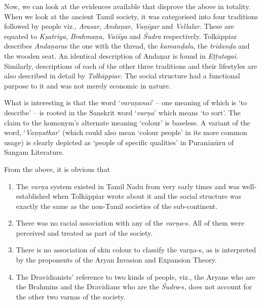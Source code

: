 Now, we can look at the evidences available that disprove the above in totality. When we look at the ancient Tamil society, it was categorised into four traditions followed by people viz., \textit{Arasar}, \textit{Andaṇar}, \textit{Vaṇigar} and \textit{Vellalar}. These are equated to \textit{Kṣatriya}, \textit{Brahmaṇa}, \textit{Vaiśya} and \textit{Śudra} respectively. Tolkāppiar describes \textit{Andaṇar}as the one with the thread, the \textit{kamanḍalu}, the \textit{tridanḍa} and the wooden seat. An identical description of Andaṇar is found in \textit{Eṭṭutogai}. Similarly, descriptions of each of the other three traditions and their lifestyles are also described in detail by \textit{Tolkāppiar}. The social structure had a functional purpose to it and was not merely economic in nature.

What is interesting is that the word ‘\textit{varuṇanai}’ – one meaning of which is ‘to describe’ – is rooted in the Sanskrit word ‘\textit{varṇa}’ which means ‘to sort’. The claim to the homonym’s alternate meaning ‘colour’ is baseless. A variant of the word, ‘\textit{Vaṇṇathar}’ (which could also mean ‘colour people’ in its more common usage) is clearly depicted as ‘people of specific qualities’ in Puranānūru of Sangam Literature.

From the above, it is obvious that

\begin{enumerate}[{\rm i)}]
\itemsep=0pt
\item The \textit{varṇa} system existed in Tamil Nadu from very early times and was well-established when Tolkāppiar wrote about it and the social structure was exactly the same as the non-Tamil societies of the sub-continent.

 \item There was no racial association with any of the \textit{varṇa}-s. All of them were perceived and treated as part of the society.

 \item There is no association of skin colour to classify the varṇa-s, as is interpreted by the proponents of the Aryan Invasion and Expansion Theory.

 \item The Dravidianists’ reference to two kinds of people, viz., the Aryans who are the Brahmins and the Dravidians who are the \textit{Śudra}-s, does not account for the other two varnas of the society.

\end{enumerate}


